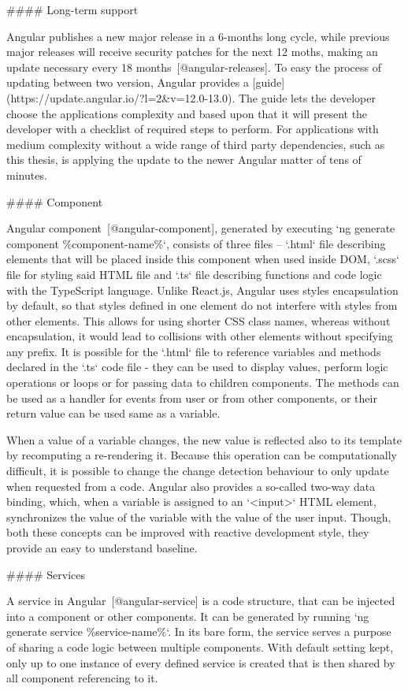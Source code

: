 \documentclass[
  digital, %
  oneside, %
  lof,     %
  lot,     %
]{fithesis4}
\begin{document}
#### Long-term support

Angular publishes a new major release in a 6-months long cycle, while previous major releases will receive security patches for the next 12 moths, making an update necessary every 18 months~[@angular-releases]. To easy the process of updating between two version, Angular provides a [guide](https://update.angular.io/?l=2&v=12.0-13.0). The guide lets the developer choose the applications complexity and based upon that it will present the developer with a checklist of required steps to perform. For applications with medium complexity without a wide range of third party dependencies, such as this thesis, is applying the update to the newer Angular matter of tens of minutes.

#### Component

Angular component~[@angular-component], generated by executing `ng generate component \%component-name\%`, consists of three files -- `.html` file describing elements that will be placed inside this component when used inside DOM, `.scss` file for styling said HTML file and `.ts` file describing functions and code logic with the TypeScript language. Unlike React.js, Angular uses styles encapsulation by default, so that styles defined in one element do not interfere with styles from other elements. This allows for using shorter CSS class names, whereas without encapsulation, it would lead to collisions with other elements without specifying any prefix. It is possible for the `.html` file to reference variables and methods declared in the `.ts` code file - they can be used to display values, perform logic operations or loops or for passing data to children components. The methods can be used as a handler for events from user or from other components, or their return value can be used same as a variable.

When a value of a variable changes, the new value is reflected also to its template by recomputing a re-rendering it. Because this operation can be computationally difficult, it is possible to change the change detection behaviour to only update when requested from a code. Angular also provides a so-called two-way data binding, which, when a variable is assigned to an `<input>` HTML element, synchronizes the value of the variable with the value of the user input. Though, both these concepts can be improved with reactive development style, they provide an easy to understand baseline.

#### Services

A service in Angular~[@angular-service] is a code structure, that can be injected into a component or other components. It can be generated by running `ng generate service \%service-name\%`. In its bare form, the service serves a purpose of sharing a code logic between multiple components. With default setting kept, only up to one instance of every defined service is created that is then shared by all component referencing to it.
\end{document}

